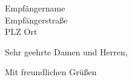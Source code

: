 \documentclass[
    fontsize=12pt,              %
    paper=a4,                   %
    parskip=half,               %
    footnotes=true,             %
    firsthead=true,             %
    firstfoot=true,             %
    locfield=wide,              %
    enlargefirstpage,           %
    DIN                         %
]{scrlttr2}
\begin{document}
\begin{letter}{Empfängername\\Empfängerstraße\\PLZ Ort}





\setpdfmetadata

\opening{Sehr geehrte Damen und Herren,}

\lipsum[1-5]

\closing{Mit freundlichen Grüßen}


\encl{}

\end{letter}
\end{document}
